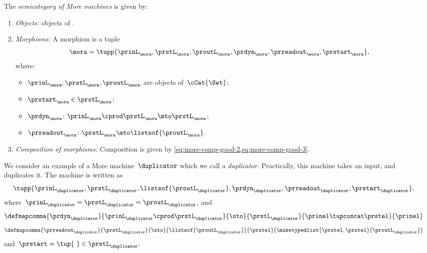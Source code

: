 \begin{definition}[\More]
    \label{def:More}
    The \emph{semicategory of More machines} \More is given by:
    \begin{enumerate}
        \item \emph{Objects:} objects of \cCat{\Set}.
        \item \emph{Morphisms:}
              A morphism is a tuple
              \begin{equation*}
                  \mora = \tupp{\prinL_{\mora},\prstL_{\mora}, \proutL_{\mora},\prdyn_{\mora},\prreadout_{\mora},\prstart_{\mora}},
              \end{equation*}
              where:
              \begin{itemize}
                  \item $\prinL_{\mora},\prstL_{\mora}, \proutL_{\mora}$ are objects of~$\cCat{\Set}$;
                  \item $\prstart_{\mora} \in \prstL_{\mora}$;
                  \item $ \prdyn_{\mora} \colon \prinL_{\mora} \cprod \prstL_{\mora} \mto \prstL_{\mora}$;
                  \item $ \prreadout_{\mora} \colon \prstL_{\mora}  \mto \listsof{\proutL_{\mora}}$.
              \end{itemize}
        \item \emph{Composition of morphisms:}
              Composition is given by \cref{eq:more-comp-good-2,eq:more-comp-good-3}.
    \end{enumerate}
\end{definition}

\begin{example}[Duplicator]
    We consider an example of a More machine~$\duplicator$ which we call a \emph{duplicator}.
    Practically, this machine takes an input, and duplicates it.
    The machine is written as
    \begin{equation*}
        \tupp{\prinL_{\duplicator},\prstL_{\duplicator},\listsof{\proutL_{\duplicator}},\prdyn_{\duplicator},\prreadout_{\duplicator},\prstart_{\duplicator}},
    \end{equation*}
    where~$\prinL_{\duplicator}=\prstL_{\duplicator}=\proutL_\duplicator$, and
    \begin{equation*}
        \defmapcomma{\prdyn_\duplicator}
        { \prinL_\duplicator \cprod \prstL_\duplicator}
        {\sto}
        {\prstL_\duplicator}
        {\prinel \tupconcat \prstel}
        {\prinel}
    \end{equation*}
    \begin{equation*}
        \defmapcomma{\prreadout_\duplicator}
        {\prstL_\duplicator}
        {\sto}
        {\listsof{\proutL_\duplicator}}
        {\prstel}
        {\maketypedlist{\prstel,\prstel}{\proutL_\duplicator}}
    \end{equation*}
    and~$\prstart=\tup{ \ } \in \prstL_\duplicator$.
\end{example}

